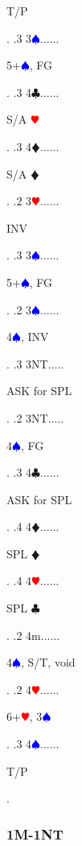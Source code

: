 \documentclass[a4paper]{article}
\newcommand{\BC}{\textcolor{OliveGreen}{$\clubsuit$}}
\newcommand{\BD}{\textcolor{RedOrange}{$\vardiamondsuit$}}
\newcommand{\BH}{\textcolor{Red}{$\varheartsuit${}}}
\newcommand{\BS}{\textcolor{Blue}{$\spadesuit${}}}
\begin{document}
{\begin{minipage}[t]{0.8\textwidth}
T/P
\end{minipage}. 
 .3 3\BS......\begin{minipage}[t]{0.8\textwidth}
5+\BS , FG
\end{minipage}. 
 .3 4\BC......\begin{minipage}[t]{0.8\textwidth}
S/A \BH 
\end{minipage}. 
 .3 4\BD......\begin{minipage}[t]{0.8\textwidth}
S/A \BD 
\end{minipage}. 
 .2 3\BH......\begin{minipage}[t]{0.8\textwidth}
INV
\end{minipage}. 
 .3 3\BS......\begin{minipage}[t]{0.8\textwidth}
5+\BS , FG
\end{minipage}. 
 .2 3\BS......\begin{minipage}[t]{0.8\textwidth}
4\BS , INV
\end{minipage}. 
 .3 3NT.....\begin{minipage}[t]{0.8\textwidth}
ASK for SPL
\end{minipage}. 
 .2 3NT.....\begin{minipage}[t]{0.8\textwidth}
4\BS , FG
\end{minipage}. 
 .3 4\BC......\begin{minipage}[t]{0.8\textwidth}
ASK for SPL
\end{minipage}. 
 .4 4\BD......\begin{minipage}[t]{0.8\textwidth}
SPL \BD 
\end{minipage}. 
 .4 4\BH......\begin{minipage}[t]{0.8\textwidth}
SPL \BC 
\end{minipage}. 
 .2 4m......\begin{minipage}[t]{0.8\textwidth}
4\BS , S/T, void
\end{minipage}. 
 .2 4\BH......\begin{minipage}[t]{0.8\textwidth}
6+\BH , 3\BS 
\end{minipage}. 
 .3 4\BS......\begin{minipage}[t]{0.8\textwidth}
T/P
\end{minipage}. 
}
\bigbreak
\subsubsection{1M-1NT}
\end{document}

